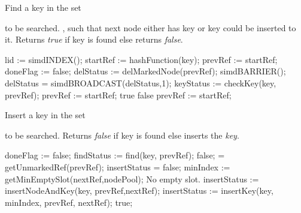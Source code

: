 \documentclass[11pt,onecolumn]{IEEEtran}
\begin{document}
\begin{algorithm}
  \caption{Find a key in the set}
  \label{alg:find}
  \begin{algorithmic}[1]
    \Require
        to be searched.
    \Ensure
       , such that next node either has key or key could
               be inserted to it.
       \Statex Returns {\it true} if key is found else returns {\it false}.
    
       \State lid := simdINDEX();
       \State startRef := hashFunction(key);
       \State prevRef  := startRef;
       \State doneFlag := false;
             \State delStatus := delMarkedNode(prevRef);
          \EndIf
          \State simdBARRIER();
          \State delStatus = simdBROADCAST(delStatus,1);
             \State keyStatus := checkKey(key, prevRef);
                \State prevRef := startRef;
                \State 
                \Return true
                \State 
                \Return false
             \EndIf
          \Else
             \State prevRef := startRef;   
          \EndIf
       \EndWhile
    \EndFunction
  \end{algorithmic}
\end{algorithm}

\begin{algorithm}
  \caption{Insert a key in the set}
  \label{alg:insert}
  \begin{algorithmic}[1]
    \Require
        to be searched.
    \Ensure
       \Statex Returns {\it false} if key is found else inserts the {\it key}.
               
    \Statex
      \State doneFlag := false;
        \State findStatus := find(key, prevRef);
          \State
          \Return false;
        \EndIf
         = getUnmarkedRef(prevRef);
          \State insertStatus = false;
          \State minIndex := getMinEmptySlot(nextRef,nodePool);
           \Comment No empty slot.
            \State insertStatus := insertNodeAndKey(key, prevRef,nextRef);
            \State insertStatus := insertKey(key, minIndex, prevRef, nextRef);
          \EndIf
            \State
            \Return true;
          \EndIf
        \EndIf
      \EndWhile
    \EndFunction
  \end{algorithmic}
\end{algorithm}
\end{document}
